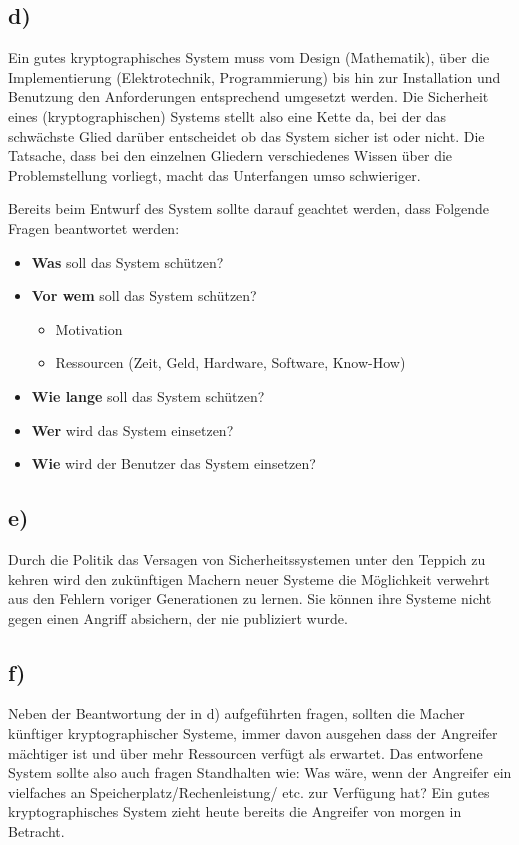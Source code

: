 \documentclass[10pt,a4paper]{article}
\begin{document}
\subsection*{d)}
Ein gutes kryptographisches System muss vom Design (Mathematik), über die Implementierung (Elektrotechnik, Programmierung) bis hin zur Installation und Benutzung den Anforderungen entsprechend umgesetzt werden. Die Sicherheit eines (kryptographischen) Systems stellt also eine Kette da, bei der das schwächste Glied darüber entscheidet ob das System sicher ist oder nicht. Die Tatsache, dass bei den einzelnen Gliedern verschiedenes Wissen über die Problemstellung vorliegt, macht das Unterfangen umso schwieriger. 

Bereits beim Entwurf des System sollte darauf geachtet werden, dass Folgende Fragen beantwortet werden:

\begin{itemize}
\item \textbf{Was} soll das System schützen?
\item \textbf{Vor wem} soll das System schützen?
\begin{itemize}
\item Motivation
\item Ressourcen (Zeit, Geld, Hardware, Software, Know-How)
\end{itemize}
\item \textbf{Wie lange} soll das System schützen?
\item \textbf{Wer} wird das System einsetzen?
\item \textbf{Wie} wird der Benutzer das System einsetzen?
\end{itemize}

\subsection*{e)}
Durch die Politik das Versagen von Sicherheitssystemen unter den Teppich zu kehren wird den zukünftigen Machern neuer Systeme die Möglichkeit verwehrt aus den Fehlern voriger Generationen zu lernen. Sie können ihre Systeme nicht gegen
einen Angriff absichern, der nie publiziert wurde. 

\subsection*{f)}
Neben der Beantwortung der in d) aufgeführten fragen, sollten die Macher künftiger kryptographischer Systeme, immer davon ausgehen dass der Angreifer mächtiger ist und über mehr Ressourcen verfügt als erwartet. Das entworfene System sollte also auch fragen Standhalten wie:  Was wäre, wenn der Angreifer ein vielfaches an Speicherplatz/Rechenleistung/ etc. zur Verfügung hat?
Ein gutes kryptographisches System zieht heute bereits die Angreifer von morgen in Betracht.
\end{document}

